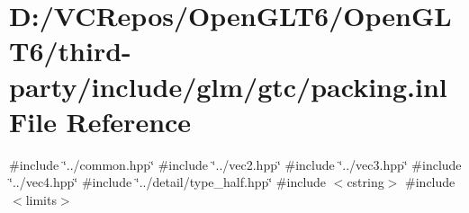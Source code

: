 \hypertarget{packing_8inl}{}\section{D\+:/\+V\+C\+Repos/\+Open\+G\+L\+T6/\+Open\+G\+L\+T6/third-\/party/include/glm/gtc/packing.inl File Reference}
\label{packing_8inl}
{\ttfamily \#include \char`\"{}../common.\+hpp\char`\"{}}\newline
{\ttfamily \#include \char`\"{}../vec2.\+hpp\char`\"{}}\newline
{\ttfamily \#include \char`\"{}../vec3.\+hpp\char`\"{}}\newline
{\ttfamily \#include \char`\"{}../vec4.\+hpp\char`\"{}}\newline
{\ttfamily \#include \char`\"{}../detail/type\+\_\+half.\+hpp\char`\"{}}\newline
{\ttfamily \#include $<$cstring$>$}\newline
{\ttfamily \#include $<$limits$>$}\newline
